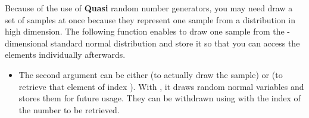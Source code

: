 Because of the use of {\bf Quasi} random number generators, you may need draw
a set of samples at once because they represent one sample from a distribution
in high dimension. The following function enables to draw one sample from  the
-dimensional standard normal distribution and store it so
that you can access the elements individually afterwards.
\begin{itemize}
\item {}
  \sshortdescribe The second argument can be either  (to actually
  draw the sample) or  (to retrieve that element of index
  ). With , it draws  random normal variables
  and stores them for future usage. They can be withdrawn using 
  with the index of the number to be retrieved.
\end{itemize}

\clearpage

